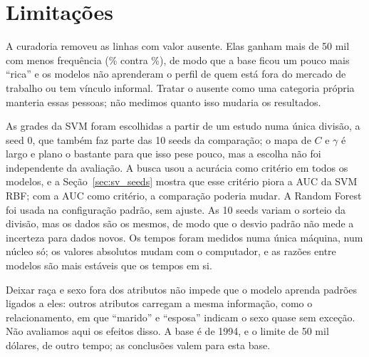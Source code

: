 \section{Limitações}\label{sec:limitacoes}

A curadoria removeu as \svAusentes{} linhas com valor ausente. Elas ganham mais de 50 mil com menos frequência (\svPositivosAusentes\% contra \svPositivos\%), de modo que a base ficou um pouco mais ``rica'' e os modelos não aprenderam o perfil de quem está fora do mercado de trabalho ou tem vínculo informal. Tratar o ausente como uma categoria própria manteria essas pessoas; não medimos quanto isso mudaria os resultados.

As grades da SVM foram escolhidas a partir de um estudo numa única divisão, a seed 0, que também faz parte das 10 seeds da comparação; o mapa de $C$ e $\gamma$ é largo e plano o bastante para que isso pese pouco, mas a escolha não foi independente da avaliação. A busca usou a acurácia como critério em todos os modelos, e a Seção~\ref{sec:sv_seeds} mostra que esse critério piora a AUC da SVM RBF; com a AUC como critério, a comparação poderia mudar. A Random Forest foi usada na configuração padrão, sem ajuste. As 10 seeds variam o sorteio da divisão, mas os dados são os mesmos, de modo que o desvio padrão não mede a incerteza para dados novos. Os tempos foram medidos numa única máquina, num núcleo só; os valores absolutos mudam com o computador, e as razões entre modelos são mais estáveis que os tempos em si.

Deixar raça e sexo fora dos atributos não impede que o modelo aprenda padrões ligados a eles: outros atributos carregam a mesma informação, como o relacionamento, em que ``marido'' e ``esposa'' indicam o sexo quase sem exceção. Não avaliamos aqui os efeitos disso. A base é de 1994, e o limite de 50 mil dólares, de outro tempo; as conclusões valem para esta base.
